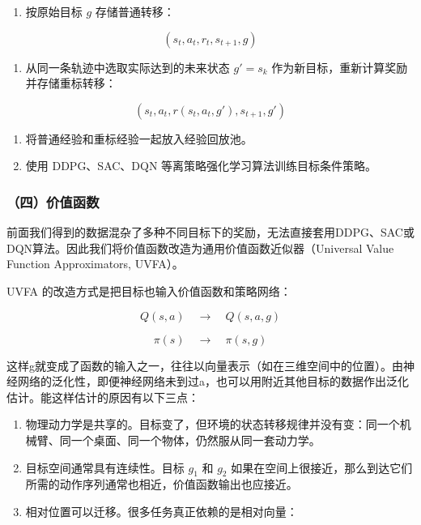 \begin{enumerate}
\def\labelenumi{\arabic{enumi}.}
\setcounter{enumi}{1}
\tightlist
\item
  按原始目标 \(g\) 存储普通转移：
\end{enumerate}

\[
(s_t,a_t,r_t,s_{t+1},g)
\]

\begin{enumerate}
\def\labelenumi{\arabic{enumi}.}
\setcounter{enumi}{2}
\tightlist
\item
  从同一条轨迹中选取实际达到的未来状态 \(g'=s_k\) 作为新目标，重新计算奖励并存储重标转移：
\end{enumerate}

\[
(s_t,a_t,r(s_t,a_t,g'),s_{t+1},g')
\]

\begin{enumerate}
\def\labelenumi{\arabic{enumi}.}
\setcounter{enumi}{3}
\tightlist
\item
  将普通经验和重标经验一起放入经验回放池。
\item
  使用 DDPG、SAC、DQN 等离策略强化学习算法训练目标条件策略。
\end{enumerate}

\hypertarget{ux56dbux4ef7ux503cux51fdux6570}{%
\subsubsection{（四）价值函数}\label{ux56dbux4ef7ux503cux51fdux6570}}

前面我们得到的数据混杂了多种不同目标下的奖励，无法直接套用DDPG、SAC或DQN算法。因此我们将价值函数改造为通用价值函数近似器（Universal Value Function Approximators, UVFA）。

UVFA 的改造方式是把目标也输入价值函数和策略网络：

\[
Q(s,a)\quad\longrightarrow\quad Q(s,a,g)
\]

\[
\pi(s)\quad\longrightarrow\quad \pi(s,g)
\]

这样g就变成了函数的输入之一，往往以向量表示（如在三维空间中的位置）。由神经网络的泛化性，即便神经网络未到过a，也可以用附近其他目标的数据作出泛化估计。能这样估计的原因有以下三点：

\begin{enumerate}
\def\labelenumi{\arabic{enumi}.}
\tightlist
\item
  物理动力学是共享的。目标变了，但环境的状态转移规律并没有变：同一个机械臂、同一个桌面、同一个物体，仍然服从同一套动力学。
\item
  目标空间通常具有连续性。目标 \(g_1\) 和 \(g_2\) 如果在空间上很接近，那么到达它们所需的动作序列通常也相近，价值函数输出也应接近。
\item
  相对位置可以迁移。很多任务真正依赖的是相对向量：
\end{enumerate}

